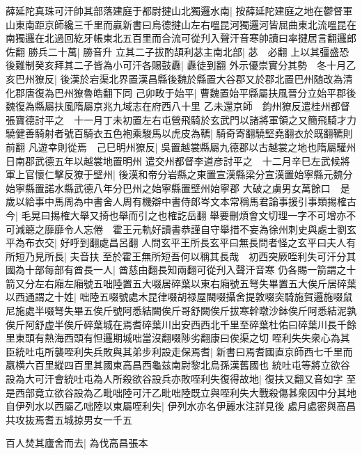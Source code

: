 薛延陀真珠可汗帥其部落建庭于都尉揵山北獨邏水南|{
	按薛延陀建庭之地在鬱督軍山東南距京師纔三千里而贏新書曰烏德揵山左右嗢昆河獨邏河皆屈曲東北流嗢昆在南獨邏在北過回紇牙帳東北五百里而合流可從刋入聲汗音寒帥讀曰率揵居言翻邏郎佐翻}
勝兵二十萬|{
	勝音升}
立其二子拔酌頡利苾主南北部|{
	苾　必翻}
上以其彊盛恐後難制癸亥拜其二子皆為小可汗各賜鼓纛|{
	纛徒到翻}
外示優崇實分其勢　冬十月乙亥巴州獠反|{
	後漢於宕渠北界置漢昌縣後魏於縣置大谷郡又於郡北置巴州随改為清化郡唐復為巴州獠魯皓翻下同}
己卯畋于始平|{
	曹魏置始平縣屬扶風晉分立始平郡後魏復為縣屬扶風隋屬京兆九域志在府西八十里}
乙未還京師　鈞州獠反遣桂州都督張寶德討平之　十一月丁未初置左右屯營飛騎於玄武門以諸將軍領之又簡飛騎才力驍健善騎射者號百騎衣五色袍乘駿馬以虎皮為韀|{
	騎奇寄翻驍堅堯翻衣於既翻韀則前翻}
凡遊幸則從焉　己巳明州獠反|{
	吳置越裳縣屬九德郡以古越裳之地也隋屬驩州日南郡武德五年以越裳地置明州}
遣交州都督李道彦討平之　十二月辛巳左武候將軍上官懷仁擊反獠于壁州|{
	後漢和帝分岩縣之東置宣漢縣梁分宣漢置始寧縣元魏分始寧縣置諾水縣武德八年分巴州之始寧縣置壁州始寧郡}
大破之虜男女萬餘口　是歲以給事中馬周為中書舍人周有機辯中書侍郎岑文本常稱馬君論事援引事類掦榷古今|{
	毛晃曰掦榷大舉又掎也舉而引之也榷訖岳翻}
舉要刪煩會文切理一字不可增亦不可減聼之靡靡令人忘倦　霍王元軌好讀書恭謹自守舉措不妄為徐州刺史與處士劉玄平為布衣交|{
	好呼到翻處昌呂翻}
人問玄平王所長玄平曰無長問者怪之玄平曰夫人有所短乃見所長|{
	夫音扶}
至於霍王無所短吾何以稱其長哉　初西突厥咥利失可汗分其國為十部每部有酋長一人|{
	酋慈由翻長知兩翻可從刋入聲汗音寒}
仍各賜一箭謂之十箭又分左右廂左廂號五咄陸置五大啜居碎葉以東右廂號五弩失畢置五大俟斤居碎葉以西通謂之十姓|{
	咄陸五啜號處木昆律啜胡禄屋闕啜攝舍提敦啜突騎施賀邏施啜鼠尼施處半啜弩失畢五俟斤號阿悉結闕俟斤哥舒闕俟斤拔寒幹暾沙鉢俟斤阿悉結泥孰俟斤阿舒虚半俟斤碎葉城在焉耆碎葉川出安西西北千里至碎葉杜佑曰碎葉川長千餘里東頭有熱海西頭有怛邏期城咄當沒翻啜陟劣翻康曰俟渠之切}
咥利失失衆心為其臣統吐屯所襲咥利失兵敗與其弟步利設走保焉耆|{
	新書曰焉耆國直京師西七千里而嬴横六百里縱四百里其國東高昌西龜兹南尉黎北烏孫漢舊國也}
統吐屯等將立欲谷設為大可汗會統吐屯為人所殺欲谷設兵亦敗咥利失復得故地|{
	復扶又翻又音如字}
至是西部竟立欲谷設為乙毗咄陸可汗乙毗咄陸既立與咥利失大戰殺傷甚衆因中分其地自伊列水以西屬乙咄陸以東屬咥利失|{
	伊列水亦名伊麗水注詳見後}
處月處密與高昌共攻抜焉耆五城掠男女一千五

百人焚其廬舍而去|{
	為伐高昌張本}


